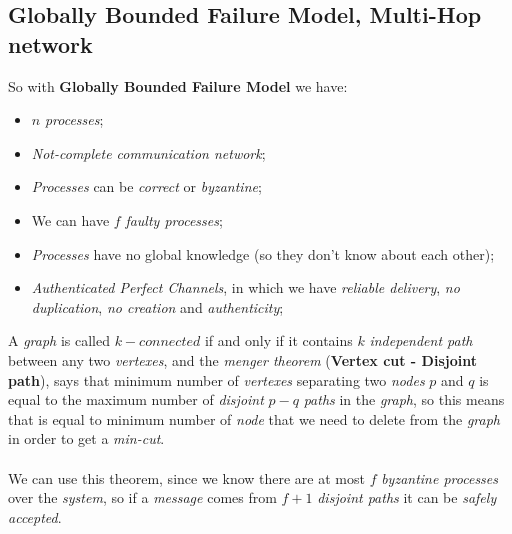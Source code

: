 \documentclass{article}
\begin{document}
\subsection{Globally Bounded Failure Model, Multi-Hop network}
So with\textbf{ Globally Bounded Failure Model} we have: 
\begin{itemize}
\item $n$ \emph{processes};
\item \emph{Not-complete communication network};
\item \emph{Processes} can be \emph{correct} or \emph{byzantine};
\item We can have $f$ \emph{faulty processes};
\item \emph{Processes} have no global knowledge (so they don't know about each other);
\item \emph{Authenticated Perfect Channels}, in which we have \emph{reliable delivery}, \emph{no duplication}, \emph{no creation} and \emph{authenticity};
\end{itemize}
A \emph{graph} is called $k-connected$ if and only if it contains $k$ \emph{independent path} between any two \emph{vertexes}, and the \emph{menger theorem} (\textbf{Vertex cut - Disjoint path}), says that minimum number of \emph{vertexes} separating two \emph{nodes} $p$ and $q$ is equal to the maximum number of \emph{disjoint} $p-q$ \emph{paths} in the \emph{graph}, so this means that is equal to minimum number of \emph{node} that we need to delete from the \emph{graph} in order to get a \emph{min-cut}. \\\\
We can use this theorem, since we know there are at most $f$ \emph{byzantine processes} over the \emph{system}, so if a \emph{message} comes from $f+1$ \emph{disjoint paths} it can be \emph{safely accepted}.
\end{document}
